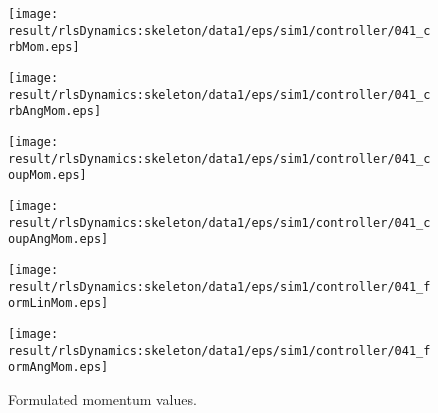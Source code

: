 \begin{figure}[h]
\centering
\begin{minipage}{0.24\linewidth}
\centering
\texttt{[image: \\result/rlsDynamics:skeleton/data1/eps/sim1/controller/041\_crbMom.eps]}
\par\footnotesize{}
\end{minipage}
\begin{minipage}{0.24\linewidth}
\centering
\texttt{[image: \\result/rlsDynamics:skeleton/data1/eps/sim1/controller/041\_crbAngMom.eps]}
\par\footnotesize{}
\end{minipage}
\begin{minipage}{0.24\linewidth}
\centering
\texttt{[image: \\result/rlsDynamics:skeleton/data1/eps/sim1/controller/041\_coupMom.eps]}
\par\footnotesize{}
\end{minipage}
\begin{minipage}{0.24\linewidth}
\centering
\texttt{[image: \\result/rlsDynamics:skeleton/data1/eps/sim1/controller/041\_coupAngMom.eps]}
\par\footnotesize{}
\end{minipage}
\begin{minipage}{0.24\linewidth}
\centering
\texttt{[image: \\result/rlsDynamics:skeleton/data1/eps/sim1/controller/041\_formLinMom.eps]}
\par\footnotesize{}
\end{minipage}
\begin{minipage}{0.24\linewidth}
\centering
\texttt{[image: \\result/rlsDynamics:skeleton/data1/eps/sim1/controller/041\_formAngMom.eps]}
\par\footnotesize{}
\end{minipage}

\caption{Formulated momentum values.}
\end{figure}
